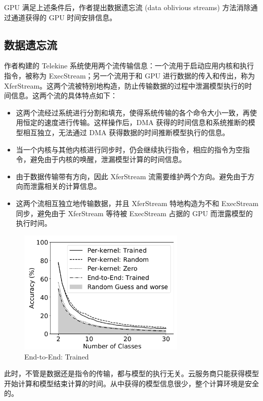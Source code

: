 \documentclass{ctexart}
\begin{document}
GPU 满足上述条件后，作者提出数据遗忘流 (data oblivious streams) 方法消除通过通道获得的 GPU 时间安排信息。

\subsection{数据遗忘流}

作者构建的 Telekine 系统使用两个流传输信息：一个流用于启动应用内核和执行指令，被称为 ExecStream；另一个流用于和 GPU 进行数据的传入和传出，称为 XferStream。这两个流被特别地构造，防止传输数据的过程中泄漏模型执行的时间信息。这两个流的具体特点如下：

\begin{itemize}
    \item 这两个流经过系统进行分割和填充，使得系统传输的各个命令大小一致，再使用恒定的速度进行传输。这样操作后，DMA 获得的时间信息和系统推断的模型相互独立，无法通过 DMA 获得数据的时间推断模型执行的信息。
    \item 当一个内核与其他内核进行同步时，仍会继续执行指令，相应的指令为空指令，避免由于内核的唤醒，泄漏模型计算的时间信息。
    \item 由于数据传输带有方向，因此 XferStream 流需要维护两个方向。避免由于方向而泄露相关的计算信息。
    \item 这两个流相互独立地传输数据，并且 XferStream 特地构造为不和 ExecStream 同步，避免由于 XferStream 等待被 ExecStream 占据的 GPU 而泄露模型的执行时间。
\end{itemize}

\begin{figure}
    \centering
    \includegraphics[width=8cm]{images/end-to-end-trained.png}
    \caption{End-to-End: Trained}
    \label{fig: end-to-end-trained}
\end{figure}

此时，不管是数据还是指令的传输，都与模型的执行无关。云服务商只能获得模型开始计算和模型结束计算的时间。从中获得的模型信息很少，整个计算环境是安全的。
\end{document}
